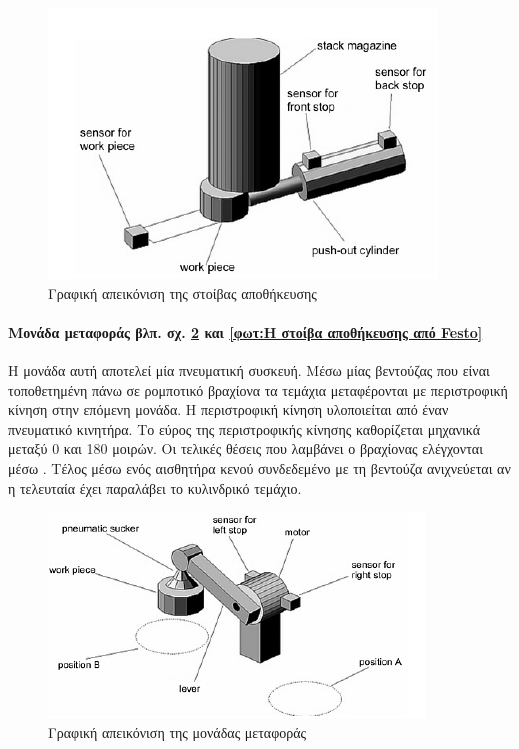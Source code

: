 \documentclass[a4paper,12pt,twoside]{report}
\begin{document}
				\begin{figure}[hp]
					\centering
					\includegraphics[scale=0.7]{StackModulePartsThrambo.png}
					\caption{Γραφική απεικόνιση της στοίβας αποθήκευσης \cite{ΤοΦυσικόΣύστημαFestoMPS}}
					\label{φωτ:Η στοίβα αποθήκευσης από Θράμπο}
				\end{figure}
	
				\paragraph{Μονάδα μεταφοράς {\footnotesize βλπ. σχ. \ref{φωτ:Η μονάδα μεταφοράς από Θράμπο} και \ref{φωτ:Η στοίβα αποθήκευσης από Festo}}} {Η μονάδα αυτή αποτελεί μία πνευματική συσκευή. Μέσω μίας βεντούζας που είναι τοποθετημένη πάνω σε ρομποτικό βραχίονα τα τεμάχια μεταφέρονται με περιστροφική κίνηση στην επόμενη μονάδα. Η περιστροφική κίνηση υλοποιείται από έναν πνευματικό κινητήρα. Το εύρος της περιστροφικής κίνησης καθορίζεται μηχανικά μεταξύ 0 και 180 μοιρών. Οι τελικές θέσεις που λαμβάνει ο βραχίονας ελέγχονται μέσω . Τέλος μέσω ενός αισθητήρα κενού συνδεδεμένο με τη βεντούζα ανιχνεύεται αν η τελευταία έχει παραλάβει το κυλινδρικό τεμάχιο.
				}
				\begin{figure}[hp]
					\centering
					\includegraphics[scale=0.7]{ChangerModulePartsThrambo.png}
					\caption{Γραφική απεικόνιση της μονάδας μεταφοράς \cite{ΤοΦυσικόΣύστημαFestoMPS}}
					\label{φωτ:Η μονάδα μεταφοράς από Θράμπο}
				\end{figure}
				
\end{document}
